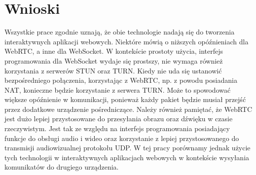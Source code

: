 \documentclass[language=polish,type=master]{aghmodern}
\begin{document}
\section{Wnioski}
Wszystkie prace zgodnie uznają, że obie technologie nadają się do tworzenia interaktywnych aplikacji webowych.
Niektóre mówią o niższych opóźnieniach dla WebRTC, a inne dla WebSocket.
W kontekście prostoty użycia, interfejs programowania dla WebSocket wydaje się prostszy, nie wymaga również korzystania z serwerów STUN oraz TURN.
Kiedy nie uda się ustanowić bezpośredniego połączenia, korzystając z WebRTC, np. z powodu posiadania NAT, konieczne będzie korzystanie z serwera TURN.
Może to spowodować większe opóźnienie w komunikacji, ponieważ każdy pakiet będzie musiał przejść przez dodatkowe urządzenie pośredniczące.
Należy również pamiętać, że WebRTC jest dużo lepiej przystosowane do przesyłania obrazu oraz dźwięku w czasie rzeczywistym.
Jest tak ze względu na interfejs programowania posiadający funkcje do obsługi audio i wideo oraz korzystanie z lepiej przystosowanego do transmisji audiowizualnej protokołu UDP.
W tej pracy porównamy jednak użycie tych technologii w interaktywnych aplikacjach webowych w kontekście wysyłania komunikatów do drugiego urządzenia.
\end{document}
